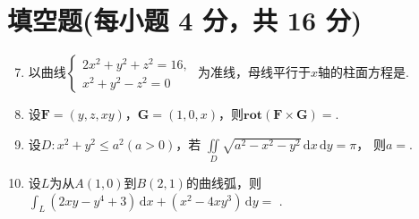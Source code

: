 \documentclass[../main.tex]{subfiles}
\begin{document}
\section{填空题(每小题 4 分，共 16 分)}
\begin{enumerate}
  \setcounter{enumi}{6}
  \item 以曲线$
          \begin{cases}
            2x^{2}+y^{2}+z^{2}=16, \\
            x^{2}+y^{2}-z^{2}=0
          \end{cases}
        $
        为准线，母线平行于$x$轴的柱面方程是\underline{\hspace{3cm}}.

  \item 设$\boldsymbol{F}=(y,z,xy)$，$\boldsymbol{G}=(1,0,x)$，则$\mathbf{rot}(\boldsymbol{F}\times \boldsymbol{G})=$\underline{\hspace{3cm}}.

  \item 设$D:x^{2}+y^{2}\leq a^{2}(a>0)$，若
        $
          \iint\limits_{D}\sqrt{a^{2}-x^{2}-y^{2}}\,\mathrm{d}x\,\mathrm{d}y=\pi
        $，
        则$a=$\underline{\hspace{3cm}}.

  \item 设$L$为从$A(1,0)$到$B(2,1)$的曲线弧，则$
          \int_{L}\left(2xy-y^{4}+3\right)\,\mathrm{d}x+\left(x^{2}-4xy^{3}\right)\,\mathrm{d}y=
        $
        \underline{\hspace{3cm}}.

\end{enumerate}
\end{document}
